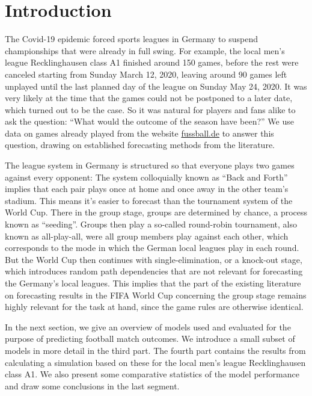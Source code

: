\documentclass[12pt,a4paper]{article}
\begin{document}
\hypertarget{introduction}{%
\section{Introduction}\label{introduction}}

The Covid-19 epidemic forced sports leagues in Germany to suspend
championships that were already in full swing. For example, the local
men's league Recklinghausen class A1 finished around 150 games, before
the rest were canceled starting from Sunday March 12, 2020, leaving
around 90 games left unplayed until the last planned day of the league
on Sunday May 24, 2020. It was very likely at the time that the games
could not be postponed to a later date, which turned out to be the case.
So it was natural for players and fans alike to ask the question:
\enquote{What would the outcome of the season have been?} We use data on
games already played from the website
\href{http://www.fussball.de/spieltagsuebersicht/re-kl-a-1-kreis-recklinghausen-kreisliga-a-herren-saison1920-westfalen/-/staffel/027II28DH8000009VS5489B3VS3GHJJU-G\#!/}{fussball.de}
to answer this question, drawing on established forecasting methods from
the literature.

The league system in Germany is structured so that everyone plays two
games against every opponent: The system colloquially known as
\enquote{Back and Forth} implies that each pair plays once at home and
once away in the other team's stadium. This means it's easier to
forecast than the tournament system of the World Cup. There in the group
stage, groups are determined by chance, a process known as
\enquote{seeding}. Groups then play a so-called round-robin tournament,
also known as all-play-all, were all group members play against each
other, which corresponds to the mode in which the German local leagues
play in each round. But the World Cup then continues with
single-elimination, or a knock-out stage, which introduces random path
dependencies that are not relevant for forecasting the Germany's local
leagues. This implies that the part of the existing literature on
forecasting results in the FIFA World Cup concerning the group stage
remains highly relevant for the task at hand, since the game rules are
otherwise identical.

In the next section, we give an overview of models used and evaluated
for the purpose of predicting football match outcomes. We introduce a
small subset of models in more detail in the third part. The fourth part
contains the results from calculating a simulation based on these for
the local men's league Recklinghausen class A1. We also present some
comparative statistics of the model performance and draw some
conclusions in the last segment.
\end{document}
